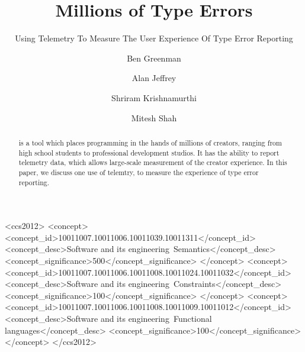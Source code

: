 \documentclass[
  acmsmall,
  review,
  anonymous,
]{acmart}
\begin{document}
\title{Millions of Type Errors}
\subtitle{Using Telemetry To Measure The User Experience Of Type Error Reporting}


\author{Ben Greenman}

\author{Alan Jeffrey}
\email{}

\author{Shriram Krishnamurthi}

\author{Mitesh Shah}
\email{}


\begin{abstract}
   is a tool which places programming in the hands of
  millions of creators, ranging from high school students to professional
  development studios. It has the ability to report telemetry data,
  which allows large-scale measurement of the creator experience. In
  this paper, we discuss one use of telemtry, to measure the experience
  of type error reporting.
\end{abstract}


\begin{CCSXML}
<ccs2012>
<concept>
<concept_id>10011007.10011006.10011039.10011311</concept_id>
<concept_desc>Software and its engineering~Semantics</concept_desc>
<concept_significance>500</concept_significance>
</concept>
<concept>
<concept_id>10011007.10011006.10011008.10011024.10011032</concept_id>
<concept_desc>Software and its engineering~Constraints</concept_desc>
<concept_significance>100</concept_significance>
</concept>
<concept>
<concept_id>10011007.10011006.10011008.10011009.10011012</concept_id>
<concept_desc>Software and its engineering~Functional languages</concept_desc>
<concept_significance>100</concept_significance>
</concept>
</ccs2012>
\end{CCSXML}
\end{document}
